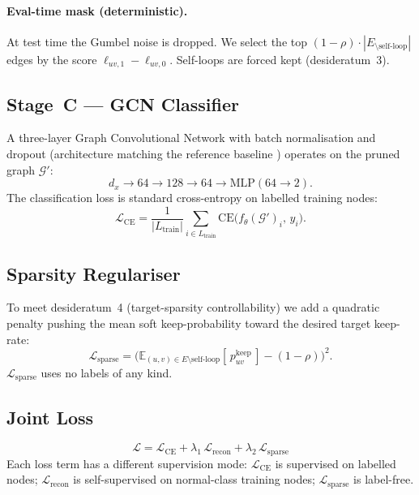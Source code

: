 \documentclass[11pt,a4paper]{report}
\theoremstyle{definition}
\theoremstyle{remark}
\begin{document}
\paragraph{Eval-time mask (deterministic).}
At test time the Gumbel noise is dropped. We select the top
$(1-\rho)\cdot|E_{\setminus\text{self-loop}}|$ edges by the score
$\ell_{uv,1}-\ell_{uv,0}$. Self-loops are forced kept (desideratum~3).

\subsection{Stage~C --- GCN Classifier}

A three-layer Graph Convolutional Network with batch normalisation and
dropout (architecture matching the reference baseline
\cite{villegas2023gnn}) operates on the pruned graph $\mathcal{G}'$:
\[d_x \to 64 \to 128 \to 64 \to \text{MLP}(64\to 2).\]
The classification loss is standard cross-entropy on labelled training
nodes:
\begin{equation}
\mathcal{L}_{\text{CE}}
= \frac{1}{|L_{\text{train}}|}
  \sum_{i\in L_{\text{train}}}
  \mathrm{CE}\!\big(f_\theta(\mathcal{G}')_i,\, y_i\big).
\label{eq:lce}
\end{equation}

\subsection{Sparsity Regulariser}

To meet desideratum~4 (target-sparsity controllability) we add a
quadratic penalty pushing the mean soft keep-probability toward the
desired target keep-rate:
\begin{equation}
\mathcal{L}_{\text{sparse}}
= \Big(\mathbb{E}_{(u,v)\in E\setminus\text{self-loop}}
        [\,p^{\text{keep}}_{uv}\,]
   - (1-\rho)\Big)^{\!2}.
\label{eq:lsparse}
\end{equation}
$\mathcal{L}_{\text{sparse}}$ uses no labels of any kind.

\subsection{Joint Loss}

\begin{equation}
\boxed{\;\mathcal{L}
 = \mathcal{L}_{\text{CE}}
 + \lambda_1\,\mathcal{L}_{\text{recon}}
 + \lambda_2\,\mathcal{L}_{\text{sparse}}\;}
\label{eq:totalloss}
\end{equation}
Each loss term has a different supervision mode:
$\mathcal{L}_{\text{CE}}$ is supervised on labelled nodes;
$\mathcal{L}_{\text{recon}}$ is self-supervised on normal-class training
nodes; $\mathcal{L}_{\text{sparse}}$ is label-free.
\end{document}
